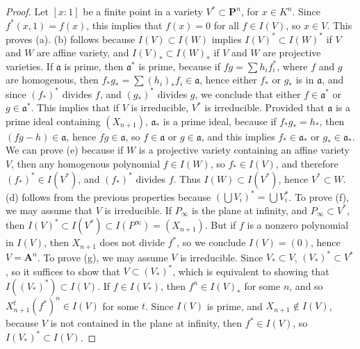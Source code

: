 \begin{proof}
    Let $[x:1]$ be a finite point in a variety $V^* \subset \mathbf{P}^n$, for $x \in K^n$. Since $f^*(x,1) = f(x)$, this implies that $f(x) = 0$ for all $f \in I(V)$, so $x \in V$. This proves (a). (b) follows because $I(V) \subset I(W)$ implies $I(V)^* \subset I(W)^*$ if $V$ and $W$ are affine variety, and $I(V)_* \subset I(W)_*$ if $V$ and $W$ are projective varieties. If $\mathfrak{a}$ is prime, then $\mathfrak{a}^*$ is prime, because if $fg = \sum h_i f_i^*$, where $f$ and $g$ are homogenous, then $f_*g_* = \sum (h_i)_* f_i \in \mathfrak{a}$, hence either $f_*$ or $g_*$ is in $\mathfrak{a}$, and since $(f_*)^*$ divides $f$, and $(g_*)^*$ divides $g$, we conclude that either $f \in \mathfrak{a}^*$ or $g \in \mathfrak{a}^*$. This implies that if $V$ is irreducible, $V^*$ is irreducible. Provided that $\mathfrak{a}$ is a prime ideal containing $(X_{n+1})$, $\mathfrak{a}_*$ is a prime ideal, because if $f_*g_* = h_*$, then $(fg - h) \in \mathfrak{a}$, hence $fg \in \mathfrak{a}$, so $f \in \mathfrak{a}$ or $g \in \mathfrak{a}$, and this implies $f_* \in \mathfrak{a}_*$ or $g_* \in \mathfrak{a}_*$. We can prove (e) because if $W$ is a projective variety containing an affine variety $V$, then any homogenous polynomial $f \in I(W)$, so $f_* \in I(V)$, and therefore $(f_*)^* \in I(V^*)$, and $(f_*)^*$ divides $f$. Thus $I(W) \subset I(V^*)$, hence $V^* \subset W$. (d) follows from the previous properties because $(\bigcup V_i)^* = \bigcup V_i^*$. To prove (f), we may assume that $V$ is irreducible. If $P_\infty$ is the plane at infinity, and $P_\infty \subset V^*$, then $I(V)^* \subset I(V^*) \subset I(P^\infty) = (X_{n+1})$. But if $f$ is a nonzero polynomial in $I(V)$, then $X_{n+1}$ does not divide $f^*$, so we conclude $I(V) = (0)$, hence $V = \mathbf{A}^n$. To prove (g), we may assume $V$ is irreducible. Since $V_* \subset V$, $(V_*)^* \subset V^*$, so it suffices to show that $V \subset (V_*)^*$, which is equivalent to showing that $I((V_*)^*) \subset I(V)$. If $f \in I(V_*)$, then $f^n \in I(V)_*$ for some $n$, and so $X_{n+1}^t(f^*)^n \in I(V)$ for some $t$. Since $I(V)$ is prime, and $X_{n+1} \not \in I(V)$, because $V$ is not contained in the plane at infinity, then $f^* \in I(V)$, so $I(V_*)^* \subset I(V)$.
\end{proof}

